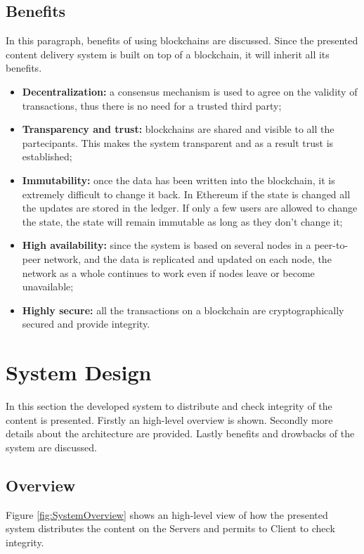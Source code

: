 \documentclass[conference,compsoc]{IEEEtran}
\begin{document}
\subsection{Benefits}
In this paragraph, benefits of using blockchains are discussed. Since the presented content delivery system is built on top of a blockchain, it will inherit all its benefits.
\begin{itemize}
	\item \textbf{Decentralization:} a consensus mechanism is used to agree on the validity of transactions, thus there is no need for a trusted third party;
	
	\item \textbf{Transparency and trust:} blockchains are shared and visible to all the partecipants. This makes the system transparent and as a result trust is established;
	
	\item \textbf{Immutability:} once the data has been written into the blockchain, it is extremely difficult to change it back. In Ethereum if the state is changed all the updates are stored in the ledger. If only a few users are allowed to change the state, the state will remain immutable as long as they don't change it;
	
	\item \textbf{High availability:} since the system is based on several nodes in a peer-to-peer network, and the data is replicated and updated on each node, the network as a whole continues to work even if nodes leave or become unavailable;
	
	\item \textbf{Highly secure:} all the transactions on a blockchain are cryptographically secured and provide integrity.
	\vspace{10pt}
\end{itemize} 

\section{System Design}
In this section the developed system to distribute and check integrity of the content is presented. Firstly an high-level overview is shown. Secondly more details about the architecture are provided. Lastly benefits and drowbacks of the system are discussed.

\subsection{Overview}
Figure \ref{fig:SystemOverview} shows an high-level view of how the presented system distributes the content on the Servers and permits to Client to check integrity.
\end{document}
